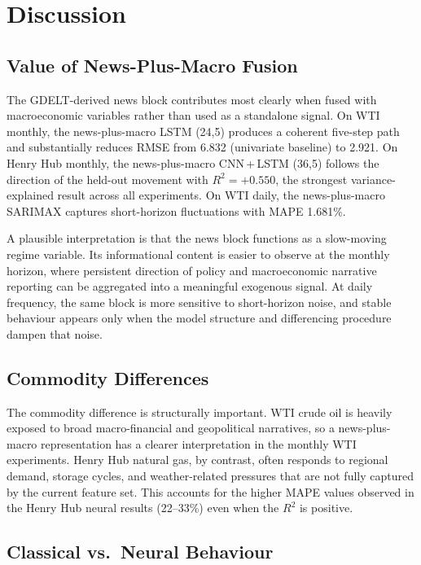 \documentclass[12pt,a4paper]{article}
\begin{document}
\section{Discussion}\label{sec:discussion}

\subsection{Value of News-Plus-Macro Fusion}

The GDELT-derived news block contributes most clearly when fused with macroeconomic variables rather than used as a standalone signal. On WTI monthly, the news-plus-macro LSTM (24,5) produces a coherent five-step path and substantially reduces RMSE from 6.832 (univariate baseline) to 2.921. On Henry Hub monthly, the news-plus-macro CNN\,+\,LSTM (36,5) follows the direction of the held-out movement with $R^2 = +0.550$, the strongest variance-explained result across all experiments. On WTI daily, the news-plus-macro SARIMAX captures short-horizon fluctuations with MAPE 1.681\%.

A plausible interpretation is that the news block functions as a slow-moving regime variable. Its informational content is easier to observe at the monthly horizon, where persistent direction of policy and macroeconomic narrative reporting can be aggregated into a meaningful exogenous signal. At daily frequency, the same block is more sensitive to short-horizon noise, and stable behaviour appears only when the model structure and differencing procedure dampen that noise.

\subsection{Commodity Differences}

The commodity difference is structurally important. WTI crude oil is heavily exposed to broad macro-financial and geopolitical narratives, so a news-plus-macro representation has a clearer interpretation in the monthly WTI experiments. Henry Hub natural gas, by contrast, often responds to regional demand, storage cycles, and weather-related pressures that are not fully captured by the current feature set. This accounts for the higher MAPE values observed in the Henry Hub neural results (22–33\%) even when the $R^2$ is positive.

\subsection{Classical vs.\ Neural Behaviour}
\end{document}
